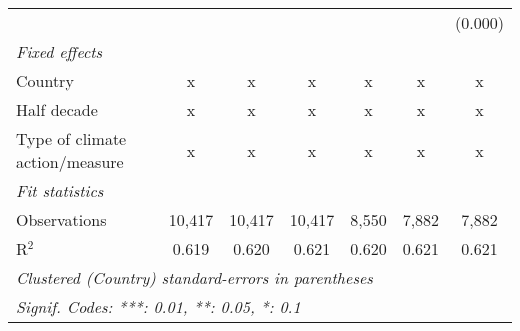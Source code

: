 \begin{tabular}{lcccccc}
                                                    &         &               &                &                &                & (0.000)\\   
   \emph{Fixed effects}\\
   Country                                          & x       & x             & x              & x              & x              & x\\  
   Half decade                                      & x       & x             & x              & x              & x              & x\\  
   Type of climate action/measure                   & x       & x             & x              & x              & x              & x\\  
   \midrule \emph{Fit statistics}\\
   Observations                                     & 10,417  & 10,417        & 10,417         & 8,550          & 7,882          & 7,882\\  
   R$^2$                                            & 0.619   & 0.620         & 0.621          & 0.620          & 0.621          & 0.621\\  
   \midrule
   \multicolumn{7}{l}{\emph{Clustered (Country) standard-errors in parentheses}}\\
   \multicolumn{7}{l}{\emph{Signif. Codes: ***: 0.01, **: 0.05, *: 0.1}}\\
\end{tabular}
\par\endgroup


